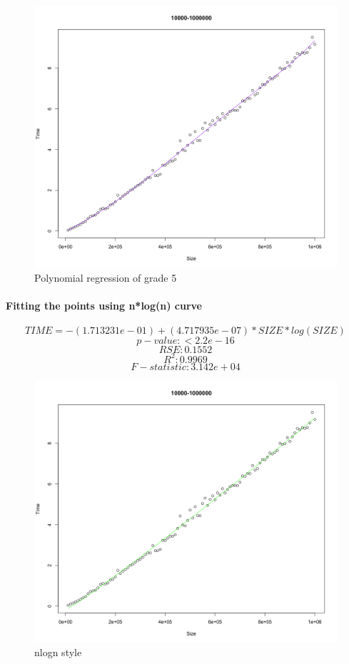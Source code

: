 \documentclass[14pt, oneside]{article}
\begin{document}
\begin{figure}[H]
\centering
\includegraphics[width=\linewidth]{Rplot09.png}
\caption{Polynomial regression of grade 5}
\end{figure}

\paragraph{Fitting the points using n*log(n) curve}

$$ TIME = -(1.713231e-01) + (4.717935e-07)*SIZE *log(SIZE)$$
$$ p-value: < 2.2e-16 $$
$$ RSE: 0.1552$$
$$ R^{2}:  0.9969$$
$$ F-statistic: 3.142e+04$$

\begin{figure}[H]
\centering
\includegraphics[width=\linewidth]{Rplot05.png}
\caption{nlogn style}
\end{figure}
\end{document}
